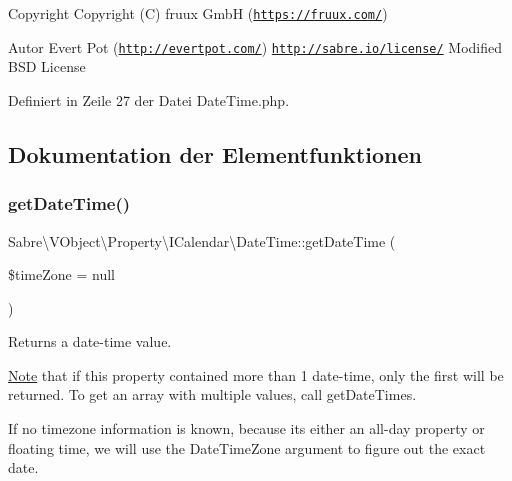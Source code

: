 \begin{DoxyCopyright}{Copyright}
Copyright (C) fruux GmbH (\href{https://fruux.com/}{\tt https\+://fruux.\+com/}) 
\end{DoxyCopyright}
\begin{DoxyAuthor}{Autor}
Evert Pot (\href{http://evertpot.com/}{\tt http\+://evertpot.\+com/})  \href{http://sabre.io/license/}{\tt http\+://sabre.\+io/license/} Modified B\+SD License 
\end{DoxyAuthor}


Definiert in Zeile 27 der Datei Date\+Time.\+php.



\subsection{Dokumentation der Elementfunktionen}
\mbox{\label{class_sabre_1_1_v_object_1_1_property_1_1_i_calendar_1_1_date_time_a089a9df90cf5fe48bc28e5c1efd6c983}} 
\subsubsection{\texorpdfstring{get\+Date\+Time()}{getDateTime()}}
{\footnotesize\ttfamily Sabre\textbackslash{}\+V\+Object\textbackslash{}\+Property\textbackslash{}\+I\+Calendar\textbackslash{}\+Date\+Time\+::get\+Date\+Time (\begin{DoxyParamCaption}\item[{Date\+Time\+Zone}]{\$time\+Zone = {\ttfamily null} }\end{DoxyParamCaption})}

Returns a date-\/time value.

\mbox{\hyperlink{class_note}{Note}} that if this property contained more than 1 date-\/time, only the first will be returned. To get an array with multiple values, call get\+Date\+Times.

If no timezone information is known, because it\textquotesingle{}s either an all-\/day property or floating time, we will use the Date\+Time\+Zone argument to figure out the exact date.


